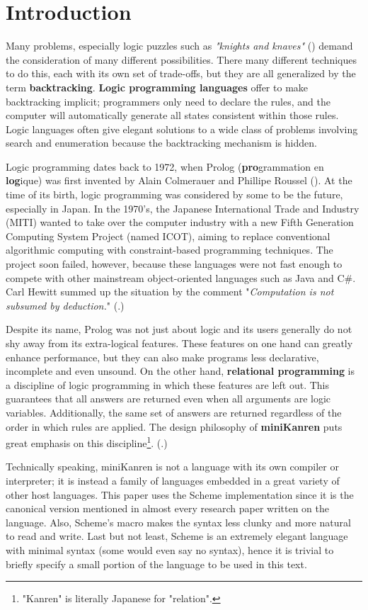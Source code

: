 \section{Introduction}
Many problems, especially logic puzzles such as \textit{"knights and knaves"} (\cite{knight}) demand the consideration of many different possibilities. There many different techniques to do this, each with its own set of trade-offs, but they are all generalized by the term \textbf{backtracking}. \textbf{Logic programming languages} offer to make backtracking implicit; programmers only need to declare the rules, and the computer will automatically generate all states consistent within those rules. Logic languages often give elegant solutions to a wide class of problems involving search and enumeration because the backtracking mechanism is hidden.

Logic programming dates back to 1972, when Prolog (\textbf{pro}grammation en \textbf{log}ique) was first invented by Alain Colmerauer and Phillipe Roussel (\cite{early-prolog}). At the time of its birth, logic programming was considered by some to be the future, especially in Japan. In the 1970's, the Japanese International Trade and Industry (MITI) wanted to take over the computer industry with a new Fifth Generation Computing System Project (named ICOT), aiming to replace conventional algorithmic computing with constraint-based programming techniques. The project soon failed, however, because these languages were not fast enough to compete with other mainstream object-oriented languages such as Java and C\#. Carl Hewitt summed up the situation by the comment "\textit{Computation is not subsumed by deduction.}" (\cite{logic-fail}.)

Despite its name, Prolog was not just about logic and its users generally do not shy away from its extra-logical features. These features on one hand can greatly enhance performance, but they can also make programs less declarative, incomplete and even unsound. On the other hand, \textbf{relational programming} is a discipline of logic programming in which these features are left out. This guarantees that all answers are returned even when all arguments are logic variables. Additionally, the same set of answers are returned regardless of the order in which rules are applied. The design philosophy of \textbf{miniKanren} puts great emphasis on this discipline\footnote{"Kanren" is literally Japanese for "relation".}. (\cite{byrdphd}.)

Technically speaking, miniKanren is not a language with its own compiler or interpreter; it is instead a family of languages embedded in a great variety of other host languages. This paper uses the Scheme implementation since it is the canonical version mentioned in almost every research paper written on the language. Also, Scheme's macro makes the syntax less clunky and more natural to read and write. Last but not least, Scheme is an extremely elegant language with minimal syntax (some would even say no syntax), hence it is trivial to briefly specify a small portion of the language to be used in this text.

